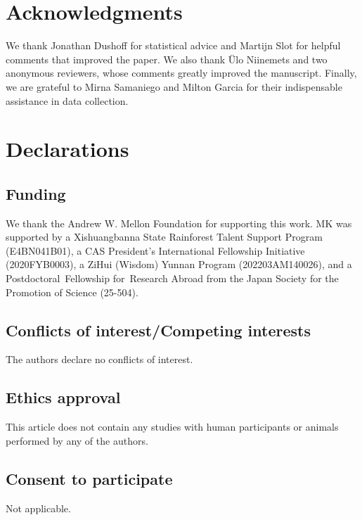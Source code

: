 \documentclass[
  12pt,
  letterpaper,
  DIV=11,
  numbers=noendperiod]{scrartcl}
\begin{document}
\section{Acknowledgments}\label{acknowledgments}

We thank Jonathan Dushoff for statistical advice and Martijn Slot for
helpful comments that improved the paper. We also thank Ülo Niinemets
and two anonymous reviewers, whose comments greatly improved the
manuscript. Finally, we are grateful to Mirna Samaniego and Milton
Garcia for their indispensable assistance in data collection.

\section{Declarations}\label{declarations}

\subsection{Funding}\label{funding}

We thank the Andrew W. Mellon Foundation for supporting this work. MK
was supported by a Xishuangbanna State Rainforest Talent Support Program
(E4BN041B01), a CAS President's International Fellowship Initiative
(2020FYB0003), a ZiHui (Wisdom) Yunnan Program (202203AM140026), and a
Postdoctoral~Fellowship for~Research Abroad from the Japan Society for
the Promotion of Science (25-504).

\subsection{Conflicts of interest/Competing
interests}\label{conflicts-of-interestcompeting-interests}

The authors declare no conflicts of interest.

\subsection{Ethics approval}\label{ethics-approval}

This article does not contain any studies with human participants or
animals performed by any of the authors.

\subsection{Consent to participate}\label{consent-to-participate}

Not applicable.
\end{document}
